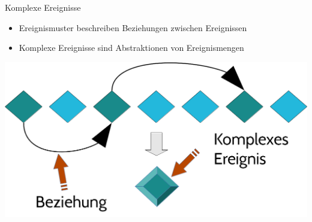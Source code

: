 \documentclass[usenames,dvipsnames]{beamer}
\begin{document}
\begin{frame}{Komplexe Ereignisse}

\begin{exampleblock}{}
    \begin{itemize}
        \item Ereignismuster beschreiben Beziehungen zwischen Ereignissen
        \item Komplexe Ereignisse sind Abstraktionen von Ereignismengen
    \end{itemize}
\end{exampleblock}

\begin{center}
    \includegraphics[scale=0.3]{img/02_cep}
\end{center}

\end{frame}
\end{document}

